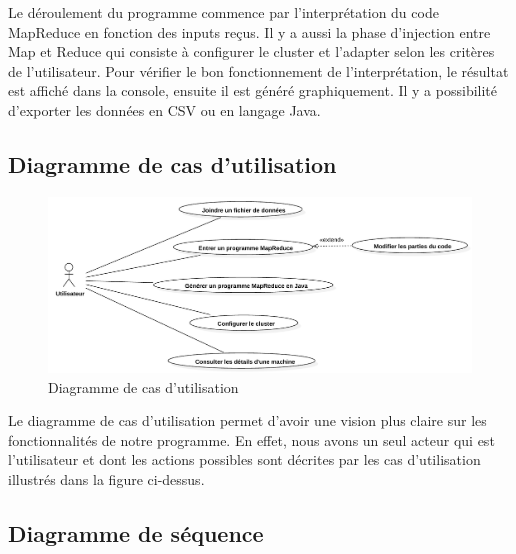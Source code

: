 \documentclass[12pt,a4paper]{article}
\begin{document}
Le déroulement du programme commence par l'interprétation du code MapReduce en fonction des inputs reçus. Il y a aussi la phase d'injection entre Map et Reduce qui consiste à configurer le cluster et l'adapter selon les critères de l'utilisateur. Pour vérifier le bon fonctionnement de l'interprétation, le résultat est affiché dans la console, ensuite il est généré graphiquement. Il y a possibilité d'exporter les données en CSV ou en langage Java.
\subsection{Diagramme de cas d'utilisation}

\begin{figure}[H]
  \centering
    \includegraphics[width=1\textwidth]{images/UseCaseDiagram.pdf}
	\caption{Diagramme de cas d'utilisation}
\end{figure}

Le diagramme de cas d'utilisation permet d'avoir une vision plus claire sur les fonctionnalités de notre programme. En effet, nous avons un seul acteur qui est l'utilisateur et dont les actions possibles sont décrites par les cas d'utilisation illustrés dans la figure ci-dessus.
\subsection{Diagramme de séquence}
\end{document}

